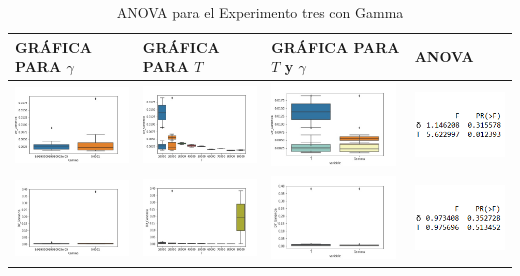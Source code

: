 \begin{table}[h]
\caption{ANOVA para el Experimento tres con Gamma}
\centering
\begin{tabular}[c]{llll}
\multicolumn{1}{p{2.95cm}}{\textbf{GRÁFICA PARA $\gamma$}} & \multicolumn{1}{p{2.95cm}}{\textbf{GRÁFICA PARA $T$}} & \multicolumn{1}{p{2.95cm}}{\textbf{GRÁFICA PARA $T$ y $\gamma$}} & \multicolumn{1}{p{2.95cm}}{\textbf{ANOVA}}  \\ \hline
\multicolumn{1}{|l|}{\includegraphics[align=t, width=33mm]{cajasGamma_exp4.jpg}}    & \multicolumn{1}{l|}{\includegraphics[align=t, width=33mm]{cajasT_exp4.jpg} } & \multicolumn{1}{l|}{\includegraphics[align=t, width=33mm]{cajasT_Gamma_exp4.jpg} } &
\multicolumn{1}{p{3.2cm}|}{\includegraphics[align=t, width=30mm]{Anova4.png}}     \\ \hline
\multicolumn{1}{|l|}{\includegraphics[align=t, width=33mm]{cajasGamma_exp42.jpg}}    & \multicolumn{1}{l|}{\includegraphics[align=t, width=33mm]{cajasT_exp42.jpg} } & \multicolumn{1}{l|}{\includegraphics[align=t, width=33mm]{cajasT_Gamma_exp42.jpg} } & \multicolumn{1}{p{3.2cm}|}{\includegraphics[align=t, width=30mm]{Anova42.png}} \\ \hline

\end{tabular}
\end{table}
